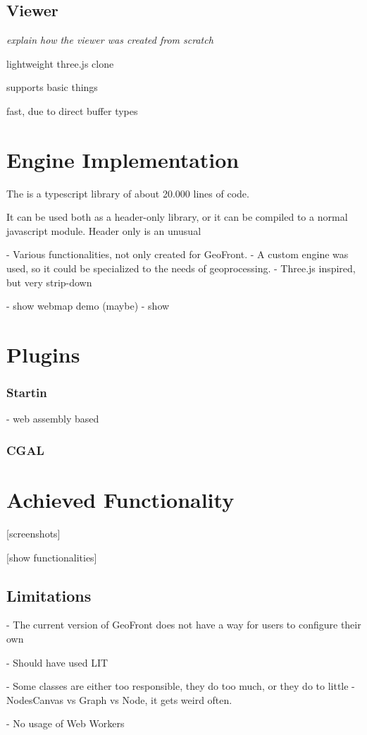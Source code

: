 \subsection{Viewer}
\emph{explain how the viewer was created from scratch}

lightweight three.js clone

supports basic things

fast, due to direct buffer types








\section{Engine Implementation}
The  is a typescript library of about 20.000 lines of code. 

It can be used both as a header-only library, or it can be compiled to a normal javascript module. 
Header only is an unusual 

- Various functionalities, not only created for GeoFront.
- A custom engine was used, so it could be specialized to the needs of geoprocessing. 
- Three.js inspired, but very strip-down

- show webmap demo (maybe)
- show 


\section{ Plugins }


\subsubsection{ Startin }
- web assembly based

\subsubsection{ CGAL }


\section{Achieved Functionality}

[screenshots]

[show functionalities]


\subsection{Limitations}
- The current version of GeoFront does not have a way for users to configure their own

- Should have used LIT

- Some classes are either too responsible, they do too much, or they do to little
  - NodesCanvas vs Graph vs Node, it gets weird often.

- No usage of Web Workers
